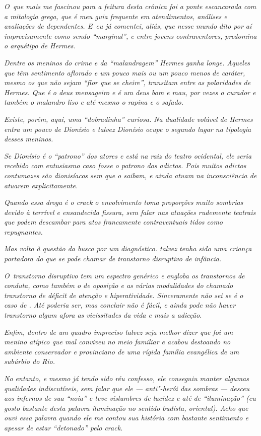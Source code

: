 \emph{O~que mais me fascinou para a feitura desta crônica foi a ponte
escancarada com a mitologia grega, que é meu guia frequente em
atendimentos, análises e avaliações de dependentes. E~eu já comentei,
aliás, que nesse mundo dito por aí imprecisamente como sendo
``marginal'', e entre jovens contraventores, predomina o arquétipo de
Hermes.}

\emph{Dentre os meninos do crime e da ``malandragem'' Hermes ganha
longe. Aqueles que têm sentimento aflorado e um pouco mais ou um pouco
menos de caráter, mesmo os que não sejam ``flor que se cheire'',
transitam entre as polaridades de Hermes. Que é o deus mensageiro e é um
deus bom e mau, por vezes o curador e também o malandro liso e até mesmo
o rapina e o safado.}

\emph{Existe, porém, aqui, uma ``dobradinha'' curiosa. Na dualidade
volúvel de Hermes entra um pouco de Dionísio e talvez Dionísio ocupe o
segundo lugar na tipologia desses meninos.}

\emph{Se Dionísio é o ``patrono'' dos atores e está na raiz do teatro
ocidental, ele seria recebido com entusiasmo caso fosse o patrono dos
adictos. Pois muitos adictos contumazes são dionisíacos sem que o
saibam, e ainda atuam na inconsciência de atuarem explicitamente.}

\emph{Quando essa droga é o crack o envolvimento toma proporções muito
sombrias devido à terrível e ensandecida fissura, sem falar nas atuações
rudemente teatrais que podem descambar para atos francamente
contraventuais tidos como repugnantes.}

\emph{Mas volto à questão da busca por um diagnóstico.  talvez tenha
sido uma criança portadora do que se pode chamar de transtorno
disruptivo de infância.}

\emph{O~transtorno disruptivo tem um espectro genérico e engloba os
transtornos de conduta, como também o de oposição e as várias
modalidades do chamado transtorno de déficit de atenção e
hiperatividade. Sinceramente não sei se é o caso de . Até poderia ser,
mas concluir não é fácil, e ainda pode não haver transtorno algum afora
as vicissitudes da vida e mais a adicção.}

\emph{Enfim, dentro de um quadro impreciso talvez seja melhor dizer que
 foi um menino atípico que mal conviveu no meio familiar e acabou
destoando no ambiente conservador e provinciano de uma rígida família
evangélica de um subúrbio do Rio.}

\emph{No entanto, e mesmo já tendo sido réu confesso, ele conseguiu
manter algumas qualidades indiscutíveis, sem falar que ele ---
anti"-herói das sombras --- desceu aos infernos de sua ``noia'' e teve
vislumbres de lucidez e até de ``iluminação'' (eu gosto bastante desta
palavra iluminação no sentido budista, oriental). Acho que ouvi essa
palavra quando ele me contou sua história com bastante sentimento e
apesar de estar ``detonado'' pelo crack.}

